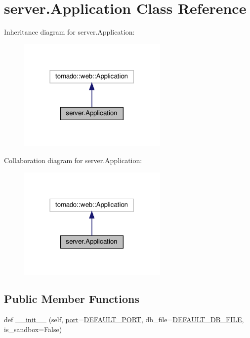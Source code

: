 \hypertarget{classserver_1_1Application}{}\section{server.\+Application Class Reference}
\label{classserver_1_1Application}


Inheritance diagram for server.\+Application\+:
\nopagebreak
\begin{figure}[H]
\begin{center}
\leavevmode
\includegraphics[width=207pt]{classserver_1_1Application__inherit__graph}
\end{center}
\end{figure}


Collaboration diagram for server.\+Application\+:
\nopagebreak
\begin{figure}[H]
\begin{center}
\leavevmode
\includegraphics[width=207pt]{classserver_1_1Application__coll__graph}
\end{center}
\end{figure}
\subsection*{Public Member Functions}
\begin{DoxyCompactItemize}
\item 
def \hyperlink{classserver_1_1Application_aa1e427d5314bf5ba10c5b45599a3bd02}{\+\_\+\+\_\+init\+\_\+\+\_\+} (self, \hyperlink{classserver_1_1Application_a46dd670e0b39f8b44bb1cf0a4114bf80}{port}=\hyperlink{namespaceserver_a799b32fdd2321df0f6d93809c1aca14a}{D\+E\+F\+A\+U\+L\+T\+\_\+\+P\+O\+RT}, db\+\_\+file=\hyperlink{namespaceserver_a4d969e2880bb5b39591808aa7992ba7f}{D\+E\+F\+A\+U\+L\+T\+\_\+\+D\+B\+\_\+\+F\+I\+LE}, is\+\_\+sandbox=False)
\end{DoxyCompactItemize}
